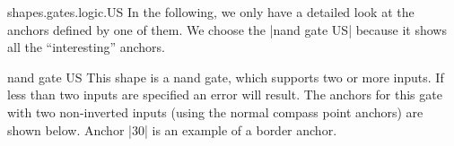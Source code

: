 \begin{pgflibrary}{shapes.gates.logic.US}
  In the following, we only have a detailed look at the anchors
  defined by one of them. We choose the |nand gate US| because it
  shows all the ``interesting'' anchors.

  \begin{shape}{nand gate US}
    This shape is a nand gate, which supports two or more inputs. If
    less than two inputs are specified an error will result. 
    The anchors for this gate with two
    non-inverted inputs (using the normal compass point anchors) are
    shown below. Anchor |30| is an example of a border anchor.
 
\begin{codeexample}[]
\Huge
{}
\end{codeexample}
  \end{shape}
\end{pgflibrary}



